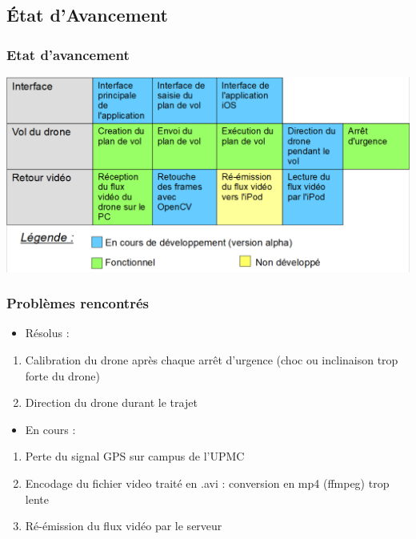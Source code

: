 \documentclass{beamer}
\begin{document}

	\begin{frame}
		\section{État d'Avancement}
		\begin{center}
		\frametitle{Etat d'avancement}
         \includegraphics[scale=0.35]{Avancement_projet.PNG}
        \end{center}
	\end{frame}
	
	
	\begin{frame}
		\begin{center}
		\frametitle{Problèmes rencontrés}
	    \begin{itemize}
                 \item Résolus :
            \end{itemize}
        \begin{enumerate}
             
            \item Calibration du drone après chaque arrêt d'urgence (choc ou inclinaison trop forte du drone)
             \item Direction du drone durant le trajet
             \end{enumerate}
            \begin{itemize}
                \item En cours :
            \end{itemize}
            \begin{enumerate}
           \item Perte du signal GPS sur campus de l'UPMC
           \item Encodage du fichier video traité en .avi : conversion en mp4 (ffmpeg) trop lente
           \item Ré-émission du flux vidéo par le serveur
           \end{enumerate}
		\end{center}
	\end{frame}

	
\end{document}
